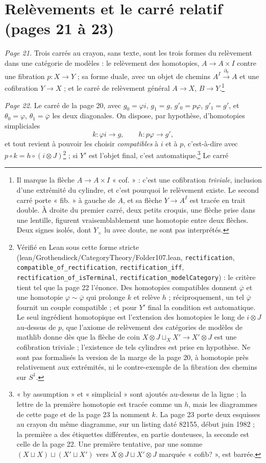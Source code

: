 \documentclass[11pt,a4paper]{article}
\begin{document}
\section*{Relèvements et le carré relatif (pages 21 à 23)}

\emph{Page 21.} Trois carrés au crayon, sans texte, sont les trois formes
du relèvement dans une catégorie de modèles : le relèvement des homotopies,
$A \to A \times I$ contre une fibration $p : X \to Y$ ; sa forme duale, avec
un objet de chemins $A^{I} \xrightarrow{\partial_{0}} A$ et une cofibration
$Y \to X$ ; et le carré de relèvement général $A \to X$, $B \to Y$.\footnote{Il
marque la flèche $A \to A \times I$ « cof. » : c'est une cofibration
\emph{triviale}, inclusion d'une extrémité du cylindre, et c'est pourquoi le
relèvement existe. Le second carré porte « fib. » à gauche de $A$, et sa
flèche $Y \to A^{I}$ est tracée en trait double. À droite du premier carré,
deux petits croquis, une flèche prise dans une lentille, figurent
vraisemblablement une homotopie entre deux flèches. Deux signes isolés,
dont $Y_{\times}$ lu avec doute, ne sont pas interprétés.}

\emph{Page 22.} Le carré de la page 20, avec $g_{0} = \varphi i$, $g_{1} = g$,
$g'_{0} = p \varphi$, $g'_{1} = g'$, et $\theta_{0} = \varphi$, $\theta_{1} =
\overline{\varphi}$ les deux diagonales. On dispose, par hypothèse,
d'homotopies simpliciales
\[
k : \varphi i \longrightarrow g, \qquad h : p \varphi \longrightarrow g',
\]
et tout revient à pouvoir les choisir \emph{compatibles} à $i$ et à $p$,
c'est-à-dire avec $p \circ k = h \circ (i \otimes J)$\footnote{Vérifié en
Lean sous cette forme stricte (lean/Grothendieck/CategoryTheory/Folder107.lean,
\texttt{rectification}, \texttt{compatible\_of\_rectification},
\texttt{rectification\_iff}, \texttt{rectification\_of\_isTerminal},
\texttt{rectification\_modelCategory}) : le critère tient tel que la page 22
l'énonce. Des homotopies compatibles donnent $\overline{\varphi}$ et une
homotopie $\varphi \sim \overline{\varphi}$ qui prolonge $k$ et relève $h$ ;
réciproquement, un tel $\overline{\varphi}$ fournit un couple compatible ; et
pour $Y'$ final la condition est automatique. Le seul ingrédient homotopique
est l'extension des homotopies le long de $i \otimes J$ au-dessus de $p$, que
l'axiome de relèvement des catégories de modèles de mathlib donne dès que la
flèche de coin $X \otimes J \sqcup_{X} X' \to X' \otimes J$ est une
cofibration triviale ; l'existence de tels cylindres est prise en hypothèse.
Ne sont pas formalisés la version de la marge de la page 20, à homotopie près
relativement aux extrémités, ni le contre-exemple de la fibration des chemins
sur $S^{1}$.} ; si $Y'$ est l'objet
final, c'est automatique.\footnote{« by assumption » et « simplicial » sont
ajoutés au-dessus de la ligne ; la lettre de la première homotopie est tracée
comme un $h$, mais les diagrammes de cette page et de la page 23 la nomment
$k$. La page 23 porte deux esquisses au crayon du même diagramme, sur un
listing daté 82155, début juin 1982 ; la première a des étiquettes
différentes, en partie douteuses, la seconde est celle de la page 22. Une
première tentative, par une somme $(X \sqcup X) \sqcup (X' \sqcup X')$ vers
$X \otimes J \sqcup X' \otimes J$ marquée « cofib? », est barrée.} Le carré
\end{document}
